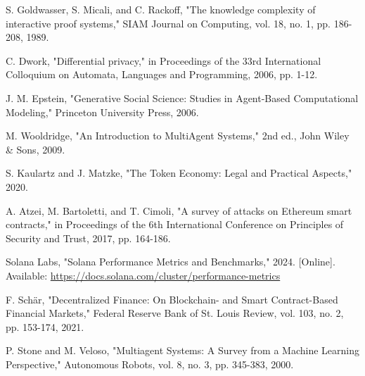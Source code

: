 \documentclass[12pt,a4paper]{article}
\begin{document}
\begin{thebibliography}{99}
S. Goldwasser, S. Micali, and C. Rackoff, "The knowledge complexity of interactive proof systems," SIAM Journal on Computing, vol. 18, no. 1, pp. 186-208, 1989.

C. Dwork, "Differential privacy," in Proceedings of the 33rd International Colloquium on Automata, Languages and Programming, 2006, pp. 1-12.

J. M. Epstein, "Generative Social Science: Studies in Agent-Based Computational Modeling," Princeton University Press, 2006.

M. Wooldridge, "An Introduction to MultiAgent Systems," 2nd ed., John Wiley \& Sons, 2009.

S. Kaulartz and J. Matzke, "The Token Economy: Legal and Practical Aspects," 2020.

A. Atzei, M. Bartoletti, and T. Cimoli, "A survey of attacks on Ethereum smart contracts," in Proceedings of the 6th International Conference on Principles of Security and Trust, 2017, pp. 164-186.

Solana Labs, "Solana Performance Metrics and Benchmarks," 2024. [Online]. Available: \url{https://docs.solana.com/cluster/performance-metrics}

F. Schär, "Decentralized Finance: On Blockchain- and Smart Contract-Based Financial Markets," Federal Reserve Bank of St. Louis Review, vol. 103, no. 2, pp. 153-174, 2021.

P. Stone and M. Veloso, "Multiagent Systems: A Survey from a Machine Learning Perspective," Autonomous Robots, vol. 8, no. 3, pp. 345-383, 2000.

\end{thebibliography}
\end{document}
